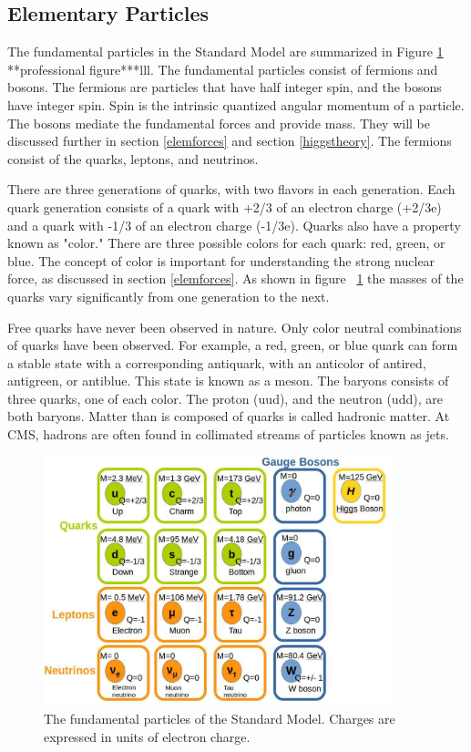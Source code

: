 \documentclass[oneside, letterpaper, oldfontcommands]{memoir}
\begin{document}
\subsection{Elementary Particles}\label{elemparticles}
\qquad The fundamental particles in the Standard Model are summarized in Figure \ref{fig:SMParticles} **professional figure***lll. The fundamental particles consist of fermions and bosons. The fermions are particles that have half integer spin, and the bosons have integer spin. Spin is the intrinsic quantized angular momentum of a particle. The bosons mediate the fundamental forces and provide mass. They will be discussed further in section \ref{elemforces} and section \ref{higgstheory}. The fermions consist of the quarks, leptons, and neutrinos. 

\qquad There are three generations of quarks, with two flavors in each generation. Each quark generation consists of a quark with +2/3 of an electron charge (+2/3e) and a quark with -1/3 of an electron charge (-1/3e). Quarks also have a property known as "color." There are three possible colors for each quark: red, green, or blue. The concept of color is important for understanding the strong nuclear force, as discussed in section \ref{elemforces}. As shown in figure ~\ref{fig:SMParticles} the masses of the quarks vary significantly from one generation to the next.

\qquad Free quarks have never been observed in nature. Only color neutral combinations of quarks have been observed. For example, a red, green, or blue quark can form a stable state with a corresponding antiquark, with an anticolor of antired, antigreen, or antiblue. This state is known as a meson. The baryons consists of three quarks, one of each color. The proton (uud), and the neutron (udd), are both baryons. Matter than is composed of quarks is called hadronic matter. At CMS, hadrons are often found in collimated streams of particles known as jets. 

\begin{figure}[here]
\includegraphics[width=0.9\textwidth]{StandardModel.pdf}
\caption{The fundamental particles of the Standard Model. Charges are expressed in units of electron charge.\cite{Agashe:2014kda} }
\label{fig:SMParticles}
\end{figure}
\end{document}
